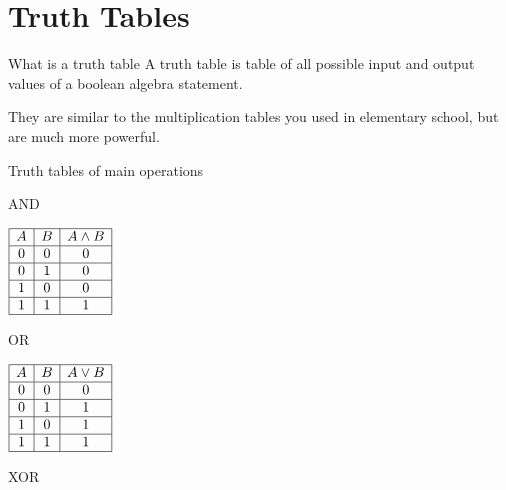 	\section{Truth Tables}
	\begin{namedframe}{What is a truth table}
		A truth table is table of all possible input and output values of a boolean algebra statement.
		\pause

		They are similar to the multiplication tables you used in elementary school, but are much more powerful.
	\end{namedframe}
	\begin{namedframe}{Truth tables of main operations}
		\begin{center}
			\begin{minipage}[t]{0.45\textwidth}
				\pause
				\begin{table}
					\caption{AND}
					\begin{math}
						\begin{array}{|c|c|c|}
							\hline
							A & B & A \wedge B\\\hline
							0 & 0 & 0\\\hline
							0 & 1 & 0\\\hline
							1 & 0 & 0\\\hline
							1 & 1 & 1\\\hline
						\end{array}
					\end{math}
				\end{table}
				\begin{table}
					\caption{OR}
					\begin{math}
						\begin{array}{|c|c|c|}
							\hline
							A & B & A \vee B\\\hline
							0 & 0 & 0\\\hline
							0 & 1 & 1\\\hline
							1 & 0 & 1\\\hline
							1 & 1 & 1\\\hline
						\end{array}
					\end{math}
				\end{table}
			\end{minipage}
			\begin{minipage}[t]{0.45\textwidth}
				\pause
				\begin{table}
					\caption{XOR}
					\begin{math}
						\begin{array}{|c|c|c|}

\end{array}
\end{math}
\end{table}
\end{minipage}
\end{center}
\end{namedframe}
